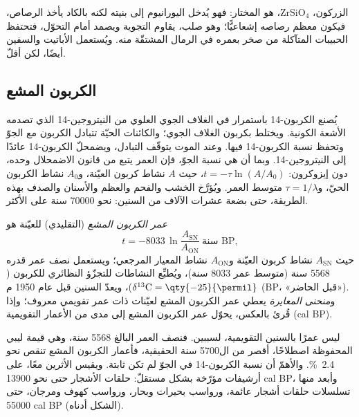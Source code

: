 الزركون، $\mathrm{ZrSiO_4}$، هو  المختار: فهو يُدخل اليورانيوم إلى بنيته لكنه بالكاد يأخذ الرصاص، فيكون معظم رصاصه إشعاعيًّا؛ وهو صلب، يقاوم التجوية ويصمد أمام التحوّل، فتحتفظ الحبيبات المتآكلة من صخر بعمره في الرمال المشتقّة منه. ويُستعمل الأباتيت والسفين أيضًا، لكن أقلّ.

\subsection*{الكربون المشع}

يُصنع الكربون-14 باستمرار في الغلاف الجوي العلوي من النيتروجين-14 الذي تصدمه الأشعة الكونية. ويختلط بكربون الغلاف الجوي؛ والكائنات الحيّة تتبادل الكربون مع الجوّ وتحفظ نسبة الكربون-14 فيها. وعند الموت يتوقّف التبادل، ويضمحلّ الكربون-14 عائدًا إلى النيتروجين-14. وبما أن  هي نسبة الجوّ، فإن العمر يتبع من قانون الاضمحلال وحده، دون إيزوكرون: $t = -\tau \ln(A/A_0)$، حيث $A$ نشاط كربون العيّنة، و$A_0$ نشاط الكربون الحيّ، و$\tau =
1/\lambda$ متوسط العمر. ويُؤرَّخ الخشب والفحم والعظم والأسنان والصدف بهذه الطريقة، حتى بضعة عشرات الآلاف من السنين: نحو \num{70000} سنة على الأكثر.

\begin{definition}\label{def:b1:radiometric-methods:radiocarbon}
\emph{عمر الكربون المشع} (التقليدي) للعيّنة هو
\[
  t = -8033 \,\ln \frac{A_{\mathrm{SN}}}{A_{\mathrm{ON}}} \ \text{سنة BP},
\]
حيث $A_{\mathrm{SN}}$ نشاط كربون العيّنة و$A_{\mathrm{ON}}$ نشاط المعيار المرجعي؛ ويستعمل نصف عمر قدره \num{5568} سنة (متوسط عمر \num{8033} سنة)، ويُطبِّع النشاطات للتجزّؤ النظائري للكربون ($\delta^{13}\mathrm{C} = \qty{-25}{\permil}$)، ويعدّ السنين قبل عام 1950 م (BP، «قبل الحاضر»). و\emph{منحنى المعايرة} يعطي عمر الكربون المشع لعيّنات ذات عمر تقويمي معروف؛ وإذا قُرئ بالعكس، يحوّل عمر الكربون المشع إلى مدى من الأعمار التقويمية (cal BP).
\end{definition}

ليس  عمرًا بالسنين التقويمية، لسببين. فنصف العمر البالغ \num{5568} سنة، وهي قيمة ليبي المحفوظة اصطلاحًا، أقصر من ال\num{5700} سنة الحقيقية، فأعمار الكربون المشع تنقص نحو \qty{2.4}{\percent}. والأهمّ أن نسبة الكربون-14 في الجوّ لم تكن ثابتة. ويقيس  الأثرين معًا، على أرشيفات مؤرّخة بشكل مستقلّ: حلقات الأشجار حتى نحو \num{13900} cal BP، وأبعد منها تسلسلات حلقات أشجار عائمة، ورواسب بحيرات وبحار، ورواسب كهوف ومرجان، حتى \num{55000} cal BP (الشكل أدناه).

